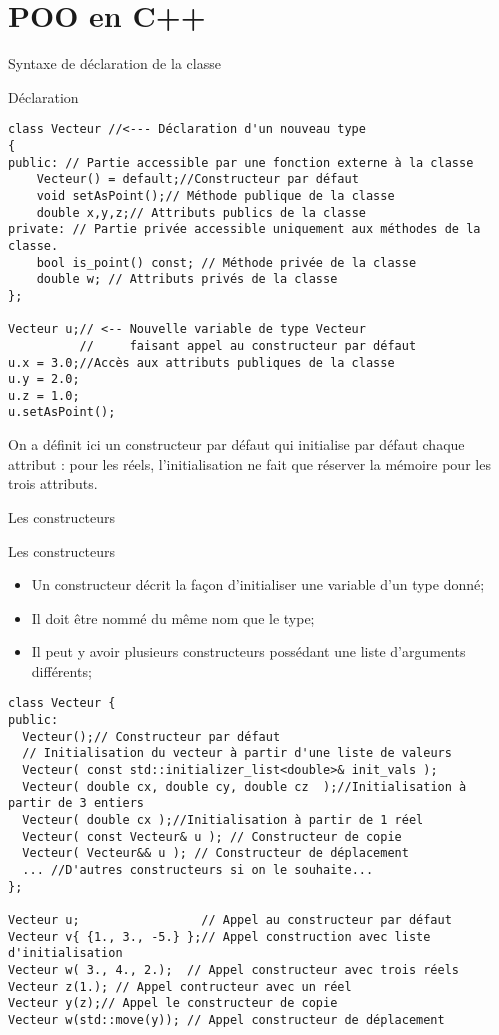\documentclass[handout,10pt]{beamer}
\begin{document}
\section{POO en C++}

\begin{frame}[fragile]{Syntaxe de déclaration de la classe}
\tiny
\begin{block}{Déclaration}
\begin{lstlisting}
class Vecteur //<--- Déclaration d'un nouveau type
{
public: // Partie accessible par une fonction externe à la classe
    Vecteur() = default;//Constructeur par défaut
    void setAsPoint();// Méthode publique de la classe
    double x,y,z;// Attributs publics de la classe
private: // Partie privée accessible uniquement aux méthodes de la classe.
    bool is_point() const; // Méthode privée de la classe
    double w; // Attributs privés de la classe
};

Vecteur u;// <-- Nouvelle variable de type Vecteur 
          //     faisant appel au constructeur par défaut
u.x = 3.0;//Accès aux attributs publiques de la classe
u.y = 2.0;
u.z = 1.0;
u.setAsPoint();
\end{lstlisting}
\end{block}
On a définit ici un constructeur par défaut qui initialise par défaut chaque attribut :
pour les réels, l'initialisation ne fait que réserver la mémoire pour les trois attributs.
\end{frame}

\begin{frame}[fragile]{Les constructeurs}
\tiny
\begin{block}{Les constructeurs}
\begin{itemize}
\item Un constructeur décrit la façon d'initialiser une variable d'un type donné;
\item Il doit être nommé du même nom que le type;
\item Il peut y avoir plusieurs constructeurs possédant une liste d'arguments différents;
\end{itemize}
\end{block}
\begin{lstlisting}
class Vecteur {
public:
  Vecteur();// Constructeur par défaut
  // Initialisation du vecteur à partir d'une liste de valeurs
  Vecteur( const std::initializer_list<double>& init_vals );
  Vecteur( double cx, double cy, double cz  );//Initialisation à partir de 3 entiers
  Vecteur( double cx );//Initialisation à partir de 1 réel
  Vecteur( const Vecteur& u ); // Constructeur de copie
  Vecteur( Vecteur&& u ); // Constructeur de déplacement
  ... //D'autres constructeurs si on le souhaite...
};

Vecteur u;                 // Appel au constructeur par défaut
Vecteur v{ {1., 3., -5.} };// Appel construction avec liste d'initialisation
Vecteur w( 3., 4., 2.);  // Appel constructeur avec trois réels
Vecteur z(1.); // Appel contructeur avec un réel
Vecteur y(z);// Appel le constructeur de copie
Vecteur w(std::move(y)); // Appel constructeur de déplacement
\end{lstlisting}
\end{frame}
\end{document}
